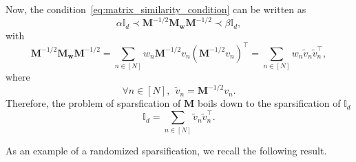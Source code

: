 \documentclass[twoside,11pt]{book}
\numberwithin{theorem}{chapter}
\numberwithin{definition}{chapter}
\numberwithin{proposition}{chapter}
\numberwithin{corollary}{chapter}
\numberwithin{example}{chapter}
\numberwithin{lemma}{chapter}
\numberwithin{assumption}{chapter}
\DeclareMathOperator{\Tran}{\intercal}
\begin{document}




Now, the condition~\eqref{eq:matrix_similarity_condition} can be written as
\begin{equation}
\alpha \mathbb{I}_{d} \prec \bm{M}^{-1/2}\bm{M}_{\bm{w}} \bm{M}^{-1/2} \prec \beta \mathbb{I}_{d},
\end{equation}
with
\begin{equation}
 \bm{M}^{-1/2}\bm{M}_{\bm{w}} \bm{M}^{-1/2}  = \sum\limits_{n \in [N]} w_{n} \bm{M}^{-1/2} v_{n} (\bm{M}^{-1/2} v_{n})^{\Tran} = \sum\limits_{n \in [N]} w_{n} \tilde{v}_{n} \tilde{v}_{n}^{\Tran},
\end{equation}
where
\begin{equation}
\forall n \in [N], \:\:\tilde{v}_{n} = \bm{M}^{-1/2} v_{n}.
\end{equation}
Therefore, the problem of sparsfication of $\bm{M}$ boils down to the sparsification of $\mathbb{I}_{d}$
\begin{equation}\label{eq:sum_to_identity}
\mathbb{I}_{d} = \sum\limits_{n \in [N]}\tilde{v}_{n}\tilde{v}_{n}^{\Tran}.
\end{equation}

As an example of a randomized sparsification, we recall the following result.
\end{document}
